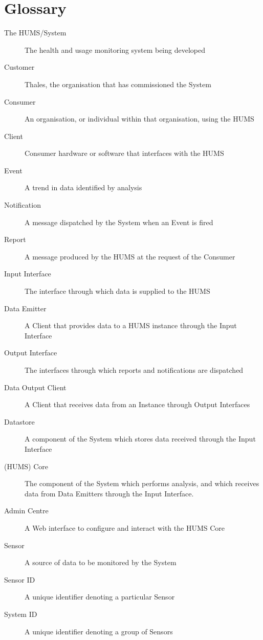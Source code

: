 \documentclass[10pt,a4paper]{article}
\begin{document}
\section{Glossary}
\label{sec:glossary}
\begin{description}%
	\item[The HUMS/System] The health and usage monitoring system being developed
	
	\vspace{0.15cm}
	\item[Customer] Thales, the organisation that has commissioned the System
	\item[Consumer] An organisation, or individual within that organisation, using the HUMS
	\item[Client] Consumer hardware or software that interfaces with the HUMS
	
	\vspace{0.15cm}
	\item[Event] A trend in data identified by analysis
	\item[Notification] A message dispatched by the System when an Event is fired
	\item[Report] A message produced by the HUMS at the request of the Consumer
	
	\vspace{0.15cm}
	\item[Input Interface] The interface through which data is supplied to  the HUMS
	\item[Data Emitter] A Client that provides data to a HUMS instance through the Input Interface
	\item[Output Interface] The interfaces through which reports and notifications are dispatched
	\item[Data Output Client] A Client that receives data from an Instance through Output Interfaces
    \item[Datastore] A component of the System which stores data received through the Input Interface
    \item[(HUMS) Core] The component of the System which performs analysis, and which receives data from Data Emitters through the Input Interface.
	\item[Admin Centre] A Web interface to configure and interact with the HUMS Core

	\vspace{0.14cm}
	\item[Sensor] A source of data to be monitored by the System
	\item[Sensor ID] A unique identifier denoting a particular Sensor
	\item[System ID] A unique identifier denoting a group of Sensors
\end{description}
\end{document}
